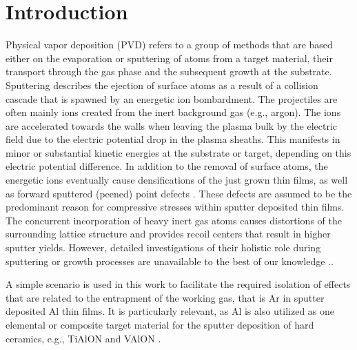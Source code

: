 \documentclass[12pt,a4paper,preprint,superscriptaddress]{revtex4-1}
\begin{document}
\maketitle

\newpage


\section{Introduction}
\label{sec:introduction}

Physical vapor deposition (PVD) refers to a group of methods that are based either on the evaporation or sputtering of atoms from a target material, their transport through the gas phase and the subsequent growth at the substrate. Sputtering describes the ejection of surface atoms as a result of a collision cascade that is spawned by an energetic ion bombardment. The projectiles are often mainly ions created from the inert background gas (e.g., argon). The ions are accelerated towards the walls when leaving the plasma bulk by the electric field due to the electric potential drop in the plasma sheaths. This manifests in minor or substantial kinetic energies at the substrate or target, depending on this electric potential difference. In addition to the removal of surface atoms, the energetic ions eventually cause densifications of the just grown thin films, as well as forward sputtered (peened) point defects \citep{abadias2018stress,d1989note,windischmann1992intrinsic,sigmund1981sputtering}. These defects are assumed to be the predominant reason for compressive stresses within sputter deposited thin films. The concurrent incorporation of heavy inert gas atoms causes distortions of the surrounding lattice structure and provides recoil centers that result in higher sputter yields. However, detailed investigations of their holistic role during sputtering or growth processes are unavailable to the best of our knowledge \citep{abadias2018stress,windischmann1992intrinsic}.. 

A simple scenario is used in this work to facilitate the required isolation of effects that are related to the entrapment of the working gas, that is Ar in sputter deposited Al thin films. It is particularly relevant, as Al is also utilized as one elemental or composite target material for the sputter deposition of hard ceramics, e.g., TiAlON and VAlON \citep{gibson2018quantum}.
\end{document}
